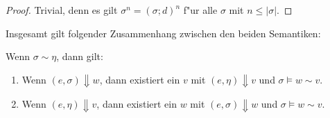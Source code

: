 \documentclass[12pt,a4paper,fleqn]{article}
\begin{document}
\begin{proof}
  Trivial, denn es gilt $\sigma^n = (\sigma;d)^n$ f"ur alle $\sigma$ mit $n \le |\sigma|$.
\end{proof}
Insgesamt gilt folgender Zusammenhang zwischen den beiden Semantiken:
\pagebreak[2]
\begin{theorem}
  Wenn $\sigma \sim \eta$, dann gilt:
  \begin{enumerate}
  \item Wenn $(e,\sigma) \Downarrow w$, dann existiert ein $v$ mit $(e,\eta) \Downarrow v$ und
    $\sigma \models w \sim v$.
  \item Wenn $(e,\eta) \Downarrow v$, dann existiert ein $w$ mit $(e,\sigma) \Downarrow w$ und
    $\sigma \models w \sim v$.
  \end{enumerate}
\end{theorem}
\end{document}
